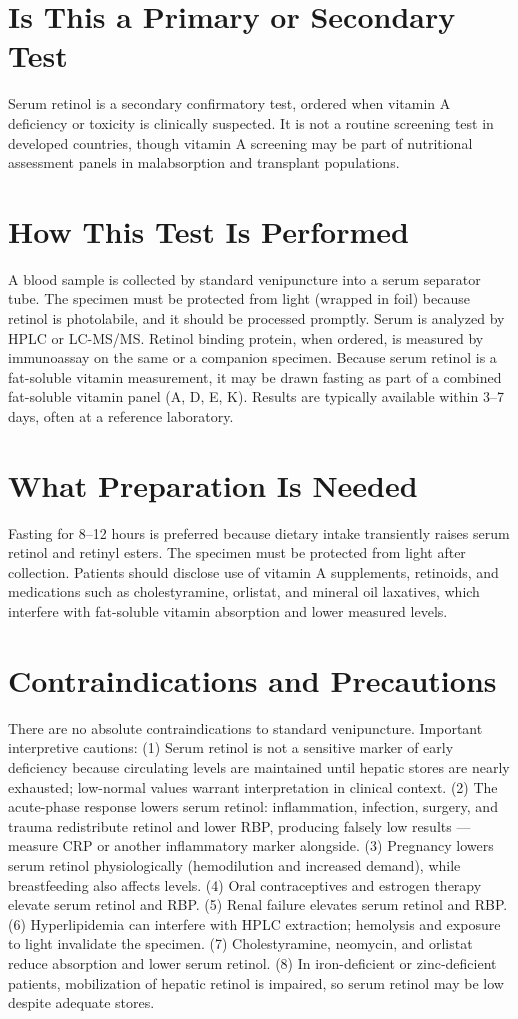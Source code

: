 \section*{Is This a Primary or Secondary Test}
Serum retinol is a secondary confirmatory test, ordered when vitamin A deficiency or toxicity is clinically suspected. It is not a routine screening test in developed countries, though vitamin A screening may be part of nutritional assessment panels in malabsorption and transplant populations.

\section*{How This Test Is Performed}
A blood sample is collected by standard venipuncture into a serum separator tube. The specimen must be protected from light (wrapped in foil) because retinol is photolabile, and it should be processed promptly. Serum is analyzed by HPLC or LC-MS/MS. Retinol binding protein, when ordered, is measured by immunoassay on the same or a companion specimen. Because serum retinol is a fat-soluble vitamin measurement, it may be drawn fasting as part of a combined fat-soluble vitamin panel (A, D, E, K). Results are typically available within 3--7 days, often at a reference laboratory.

\section*{What Preparation Is Needed}
Fasting for 8--12 hours is preferred because dietary intake transiently raises serum retinol and retinyl esters. The specimen must be protected from light after collection. Patients should disclose use of vitamin A supplements, retinoids, and medications such as cholestyramine, orlistat, and mineral oil laxatives, which interfere with fat-soluble vitamin absorption and lower measured levels.

\section*{Contraindications and Precautions}
There are no absolute contraindications to standard venipuncture. Important interpretive cautions: (1) Serum retinol is not a sensitive marker of early deficiency because circulating levels are maintained until hepatic stores are nearly exhausted; low-normal values warrant interpretation in clinical context. (2) The acute-phase response lowers serum retinol: inflammation, infection, surgery, and trauma redistribute retinol and lower RBP, producing falsely low results --- measure CRP or another inflammatory marker alongside. (3) Pregnancy lowers serum retinol physiologically (hemodilution and increased demand), while breastfeeding also affects levels. (4) Oral contraceptives and estrogen therapy elevate serum retinol and RBP. (5) Renal failure elevates serum retinol and RBP. (6) Hyperlipidemia can interfere with HPLC extraction; hemolysis and exposure to light invalidate the specimen. (7) Cholestyramine, neomycin, and orlistat reduce absorption and lower serum retinol. (8) In iron-deficient or zinc-deficient patients, mobilization of hepatic retinol is impaired, so serum retinol may be low despite adequate stores.

